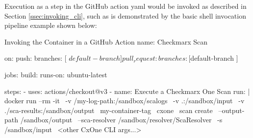 Execution as a step in the GitHub action yaml would be invoked as described in 
Section \ref{ssec:invoking_cli}, such as is demonstrated by the basic shell invocation pipeline
example shown below:\\

\begin{code}{Invoking the Container in a GitHub Action}{}{}
name: Checkmarx Scan

on:
    push:
        branches: [ $default-branch ]
    pull_request:
        branches: [ $default-branch ]

jobs:
    build:
        runs-on: ubuntu-latest

    steps:
        - uses: actions/checkout@v3
        - name: Execute a Checkmarx One Scan
            run: |
                docker run --rm -it \
                -v /my-log-path:/sandbox/scalogs \
                -v .:/sandbox/input \
                -v ./sca-results:/sandbox/output \
                my-container-tag \
                cxone \
                scan create \
                --output-path /sandbox/output \
                --sca-resolver /sandbox/resolver/ScaResolver \
                -s /sandbox/input \
                <other CxOne CLI args...>            
    
\end{code}
